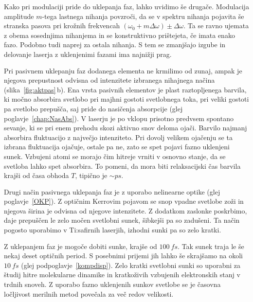Kako pri modulaciji pride do uklepanja faz, lahko uvidimo še drugače.
Modulacija amplitude $m$-tega lastnega nihanja povzroči, da se v spektru nihanja
pojavita še stranska pasova pri krožnih frekvencah $(\omega_0 + m\Delta \omega) \pm \Delta\omega$. Ta
se ravno ujemata z obema sosednjima nihanjema in se konstruktivno
prištejeta, če imata enako fazo. Podobno tudi naprej za ostala nihanja. 
S tem se zmanjšajo izgube in delovanje laserja z uklenjenimi fazami ima najnižji prag. 

Pri pasivnem uklepanju faz dodanega elementa ne krmilimo od zunaj, 
ampak je njegova prepustnost odvisna od intenzitete
izbranega nihajnega načina (slika~\ref{fig:aktpas}\,b). 
Ena vrsta pasivnih elementov je plast raztopljenega
barvila, ki močno absorbira svetlobo pri majhni gostoti svetlobnega toka, pri veliki 
gostoti pa svetlobo prepušča, saj pride do nasičenja absorpcije (glej
poglavje~\ref{chap:NasAbs}). V laserju je po vklopu prisotno predvsem 
spontano sevanje, ki se pri enem prehodu skozi aktivno snov deloma ojači. 
Barvilo najmanj absorbira fluktuacijo z največjo intenziteto. Pri dovolj 
velikem ojačenju se ta izbrana fluktuacija ojačuje, ostale pa ne, zato
se spet pojavi fazno uklenjeni sunek. Vzbujeni atomi se morajo čim hitreje
vrniti v osnovno stanje, da se svetloba lahko spet absorbira. To pomeni, da
 mora biti relaksacijski čas barvila  krajši od časa
obhoda $T$, tipično je $\sim \si{ps}$. 

Drugi način pasivnega uklepanja faz je z uporabo nelinearne optike 
(glej 
poglavje~\ref{OKP}). Z optičnim Kerrovim pojavom se snop vpadne svetlobe zoži 
in njegova širina je odvisna od njegove intenzitete. Z dodatkom zaslonke poskrbimo, 
daje prepuščen le zelo močen svetlobni sunek, šibkejši pa so zadušeni. Ta način pogosto
uporabimo v Ti:safirnih laserjih, izhodni sunki pa so 
zelo kratki.

Z uklepanjem faz je mogoče dobiti sunke, krajše od $100~\si{fs}$. 
Tak sunek traja le še nekaj deset optičnih period. S posebnimi prijemi 
jih lahko še skrajšamo na okoli $10~\si{fs}$ (glej podpoglavje~\ref{kompdisp}). 
Zelo kratki svetlobni sunki so uporabni za študij hitre molekularne dinamike 
in kratkoživih vzbujenih elektronskih stanj v trdnih snoveh. Z uporabo fazno
uklenjenih sunkov svetlobe se je časovna ločljivost merilnih metod povečala za 
več redov velikosti.

